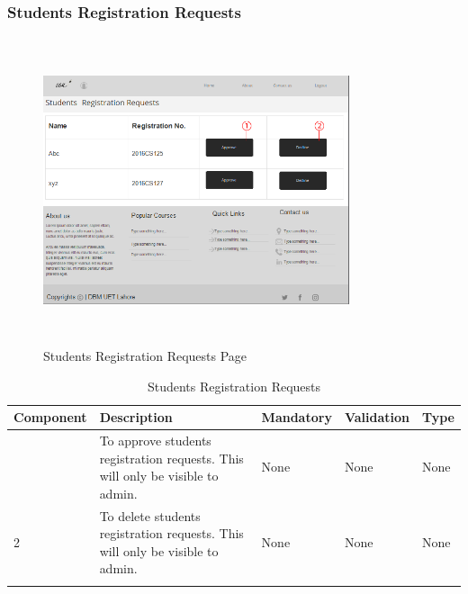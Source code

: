 \documentclass[12pt]{article}
\begin{document}
\subsubsection{Students Registration Requests}
\begin{figure}[H]
  \centering
  \includegraphics[width=9cm, height=9cm]{StudentsRegistrationRequests}
  \caption{Students Registration Requests Page}
\end{figure}

\newpage
\begin{longtable}{|>{\raggedright\arraybackslash}p{2.5cm}|>{\raggedright\arraybackslash}p{4cm}|>{\raggedright\arraybackslash}p{2.2cm}|>{\raggedright\arraybackslash}p{2cm}|>{\raggedright\arraybackslash}p{2cm}|}
\hline
\textbf{Component} & \textbf{Description} & \textbf{Mandatory} & \textbf{Validation} & \textbf{Type}\\
\hline
1 &
To approve students registration requests. This will only be visible to admin. &
None &
None &
None\\
\hline

2 &
To delete students registration requests. This will only be visible to admin. &
None &
None &
None \\
\hline

\caption{Students Registration Requests}
\end{longtable}
\end{document}
